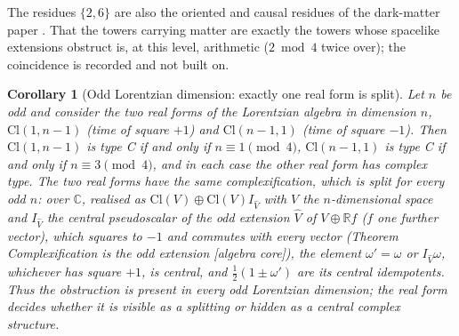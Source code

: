 \documentclass[11pt]{article}
\newtheorem{corollary}[theorem]{Corollary}
\theoremstyle{definition}
\theoremstyle{plain}
\newcommand{\changedmark}[2]{\marginpar{\raggedright\scriptsize\color{#1}#2}}
\providecommand{\C}{}\renewcommand{\C}{\mathbb{C}}
\providecommand{\Cl}{}\renewcommand{\Cl}{\mathrm{Cl}}
\providecommand{\R}{}\renewcommand{\R}{\mathbb{R}}
\begin{document}
\label{c:note.transport.setting-one-dimensional-extensions-where-obstruction-2}
The residues $\{2, 6\}$ are also the oriented and causal residues of the dark-matter paper \cite[Cor.~3.11]{ButlerT14}. That the towers carrying matter are exactly the towers whose spacelike extensions obstruct is, at this level, arithmetic ($2 \bmod 4$ twice over); the coincidence is recorded and not built on.

\begin{corollary}[Odd Lorentzian dimension: exactly one real form is split]\label{c:transport.odd-lorentzian-dimension-exactly-one-real}
\changedmark{BurntOrange}{changed since the deposit}
Let $n$ be odd and consider the two real forms of the Lorentzian algebra in dimension $n$, $\Cl(1,n{-}1)$ (time of square $+1$) and $\Cl(n{-}1,1)$ (time of square $-1$). Then $\Cl(1,n{-}1)$ is type C if and only if $n \equiv 1 \pmod 4$, $\Cl(n{-}1,1)$ is type C if and only if $n \equiv 3 \pmod 4$, and in each case the other real form has complex type. The two real forms have the same complexification, which is split for every odd $n$: over $\C$, realised as $\Cl(V) \oplus \Cl(V)I_{\hat V}$ with $V$ the $n$-dimensional space and $I_{\hat V}$ the central pseudoscalar of the odd extension $\hat V$ of $V \oplus \R f$ ($f$ one further vector), which squares to $-1$ and commutes with every vector (Theorem \emph{Complexification is the odd extension} [algebra core]), the element $\omega' = \omega$ or $I_{\hat V}\omega$, whichever has square $+1$, is central, and $\tfrac12(1 \pm \omega')$ are its central idempotents. Thus the obstruction is present in every odd Lorentzian dimension; the real form decides whether it is visible as a splitting or hidden as a central complex structure.
\end{corollary}
\end{document}
